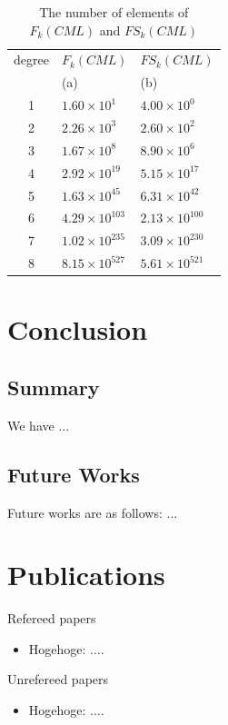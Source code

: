 \documentclass[12pt,dvipdfmx]{report}
\begin{document}
 \begin{table}[tb]
\begin{center}
\caption{The number of elements of $F_{k}(CML)$ and $FS_{k}(CML)$}
\label{tab:num_of_schemata_satisfied_srp}
 \begin{tabular}{c l l}
  \hline
 degree & $F_{k}(CML)$ &$FS_{k}(CML)$ \\
    & (a)&  (b)\\ 
  \hline
  \hline
  1 &  $1.60 \times 10^{1}$ & $4.00 \times 10^{0}$\\
  2 & $2.26 \times 10^{3}$ & $2.60 \times 10^{2}$  \\
  3 & $1.67 \times 10^{8}$ & $8.90 \times 10^{6}$\\
  4 & $2.92 \times 10^{19}$ & $5.15 \times 10^{17}$\\
  5 & $1.63 \times 10^{45}$ & $6.31 \times 10^{42}$\\
  6 & $4.29 \times 10^{103}$ & $2.13 \times 10^{100}$\\
  7 & $1.02 \times 10^{235}$ & $3.09 \times 10^{230}$\\
  8 & $8.15 \times 10^{527}$ & $5.61 \times 10^{521}$\\ 
  \hline
 \end{tabular}
\end{center}
\end{table}


\chapter{Conclusion}
\section{Summary}

We have ...

\section{Future Works}

Future works are as follows: ...

\newpage

\chapter*{Publications}

\begin{list}%
 {} %
 {} %
 \item Refereed papers
       \begin{itemize}
	\item Hogehoge: ....
       \end{itemize}
 \item Unrefereed papers
       \begin{itemize}
	\item Hogehoge: ....
       \end{itemize}
\end{list}
\end{document}
